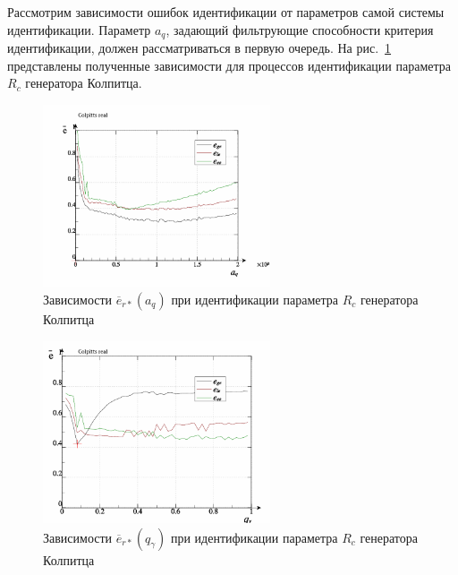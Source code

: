 Рассмотрим зависимости ошибок идентификации от параметров самой системы идентификации.
Параметр $a_q$, задающий
фильтрующие способности критерия идентификации, должен рассматриваться в первую очередь.
На рис.~\ref{atu:f:colp_real_id_qi_fv5_prm_0-p_a_q} представлены полученные зависимости
для процессов идентификации параметра $R_c$ генератора Колпитца.

\begin{figure}[htb!]
  \centerline{\includegraphics[width=0.6\textwidth]{p/colp_real_id_qi_fv5_prm_0-p_a_q.png} }
  \caption{Зависимости $\overline{e}_{r*}(a_q)$ при идентификации параметра $R_c$ генератора Колпитца}
  \label{atu:f:colp_real_id_qi_fv5_prm_0-p_a_q}
\end{figure}


\begin{figure}[htb!]
  \centerline{\includegraphics[width=0.6\textwidth]{p/colp_real_id_qi_fv5_prm_0-p_q_gamma.png} }
  \caption{Зависимости $\overline{e}_{r*}(q_\gamma)$ при идентификации параметра $R_c$ генератора Колпитца}
  \label{atu:f:colp_real_id_qi_fv5_prm_0-p_q_gamma}
\end{figure}

